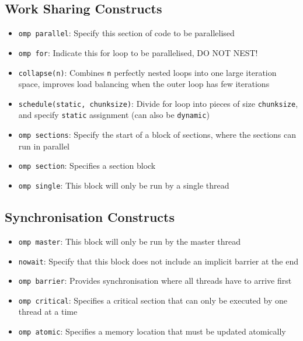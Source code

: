 \documentclass{article}
\begin{document}
\subsection{Work Sharing Constructs}
\begin{itemize}
    \item \texttt{omp parallel}: Specify this section of code to be parallelised

    \item \texttt{omp for}: Indicate this for loop to be parallelised, DO NOT NEST!
    
    \item \texttt{collapse(n)}: Combines \texttt{n} perfectly nested loops into one large iteration space, improves load balancing when the outer loop has few iterations
    
    \item \texttt{schedule(static, chunksize)}: Divide for loop into pieces of size \texttt{chunksize}, and specify \texttt{static} assignment (can also be \texttt{dynamic})

    \item \texttt{omp sections}: Specify the start of a block of sections, where the sections can run in parallel

    \item \texttt{omp section}: Specifies a section block

    \item \texttt{omp single}: This block will only be run by a single thread
\end{itemize}

\subsection{Synchronisation Constructs}
\begin{itemize}
    \item \texttt{omp master}: This block will only be run by the master thread

    \item \texttt{nowait}: Specify that this block does not include an implicit barrier at the end

    \item \texttt{omp barrier}: Provides synchronisation where all threads have to arrive first

    \item \texttt{omp critical}: Specifies a critical section that can only be executed by one thread at a time

    \item \texttt{omp atomic}: Specifies a memory location that must be updated atomically
\end{itemize}
\end{document}
